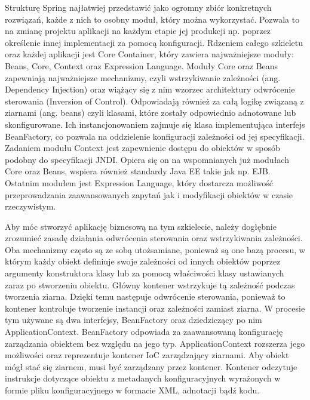 Strukturę Spring najłatwiej przedstawić jako ogromny zbiór konkretnych rozwiązań, każde z nich to osobny moduł, który można wykorzystać. Pozwala to na zmianę projektu aplikacji na każdym etapie jej produkcji np. poprzez określenie innej implementacji za pomocą konfiguracji. Rdzeniem całego szkieletu oraz każdej aplikacji jest Core Container, który zawiera najważniejsze moduły: Beans, Core, Context oraz Expression Language. Moduły Core oraz Beans zapewniają najważniejsze mechanizmy, czyli wstrzykiwanie zależności (ang. Dependency Injection) oraz wiążący się z nim wzorzec architektury odwrócenie sterowania (Inversion of Control). Odpowiadają również za całą logikę związaną z ziarnami (ang. beans) czyli klasami, które zostały odpowiednio adnotowane lub skonfigurowane. Ich instancjonowaniem zajmuje się klasa implementująca interfejs BeanFactory, co pozwala na oddzielenie konfiguracji zależności od jej specyfikacji. Zadaniem modułu Context jest zapewnienie dostępu do obiektów w sposób podobny do specyfikacji JNDI. Opiera się on na wspomnianych już modułach Core oraz Beans, wspiera również standardy Java EE takie jak np. EJB. Ostatnim modułem jest Expression Language, który dostarcza możliwość przeprowadzania zaawansowanych zapytań jak i modyfikacji obiektów w czasie rzeczywistym. 


Aby móc stworzyć aplikację biznesową na tym szkielecie, należy dogłębnie zrozumieć zasadę działania odwrócenia sterowania oraz wstrzykiwania zależności. Oba mechanizmy często są ze sobą utożsamiane, ponieważ są one bazą procesu, w którym każdy obiekt definiuje swoje zależności od innych obiektów poprzez argumenty konstruktora klasy lub za pomocą właściwości klasy ustawianych zaraz po stworzeniu obiektu. Główny kontener wstrzykuje tą zależność podczas tworzenia ziarna. Dzięki temu następuje odwrócenie sterowania, ponieważ to kontener kontroluje tworzenie instancji oraz zależności zamiast ziarna. W procesie tym używane są dwa interfejsy, BeanFactory oraz dziedziczący po nim ApplicationContext. BeanFactory odpowiada za zaawansowaną konfigurację zarządzania obiektem bez względu na jego typ. ApplicationContext rozszerza jego możliwości oraz reprezentuje kontener IoC zarządzający ziarnami. Aby obiekt mógł stać się ziarnem, musi być zarządzany przez kontener. Kontener odczytuje instrukcje dotyczące obiektu z metadanych konfiguracyjnych wyrażonych w formie pliku konfiguracyjnego w formacie XML, adnotacji bądź kodu.



